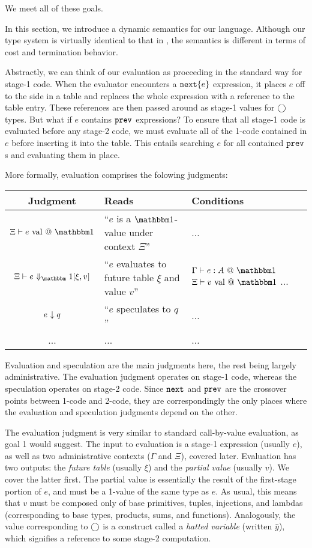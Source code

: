 \documentclass{sigplanconf}
\begin{document}
We meet all of these goals.

In this section, we introduce a dynamic semantics for our language.  Although our type system is virtually identical to that in \cite{davies96}, the semantics is different in terms of cost and termination behavior. 

Abstractly, we can think of our evaluation as proceeding in the standard way for stage-1 code. When the evaluator encounters a ${\tt next} \{e\}$ expression, it places $e$ off to the side in a table and replaces the whole expression with a reference to the table entry.  These references are then passed around as stage-1 values for $\bigcirc$ types.  But what if $e$ contains ${\tt prev}$ expressions?  To ensure that all stage-1 code is evaluated before any stage-2 code, we must evaluate all of the 1-code contained in $e$ before inserting it into the table.  This entails searching $e$ for all contained ${\tt prev}$s and evaluating them in place.  

More formally, evaluation comprises the folowing judgments:

\begin{center}
\begin{tabular}{|c|p{2.5cm}|p{2.5cm}|} \hline
Judgment & Reads & Conditions \\ \hline 
$\isvalone e$ & ``$e$ is a $\bbone$-value under context $\Xi$'' & ... \\ \hline 
$\Xi \vdash \diaonesub$ & ``$e$ evaluates to future table $\xi$ and value $v$'' 
& $\typesone e A$ 
	\newline $\isvalone v$ 
	\newline ... \\ \hline 
${e_{}} \downarrow {q_{}}$ & ``$e$ speculates to $q$'' & ... \\ \hline 
...&...&... \\ \hline
\end{tabular}
\end{center}

Evaluation and speculation are the main judgments here, the rest being largely administrative.  The evaluation judgment operates on stage-1 code, whereas the speculation operates on stage-2 code.  Since ${\tt next}$ and ${\tt prev}$ are the crossover points between 1-code and 2-code, they are correspondingly the only places where the evaluation and speculation judgments depend on the other. 


The evaluation judgment is very similar to standard call-by-value evaluation, as goal 1 would suggest.  The input to evaluation is a stage-1 expression (usually $e$), as well as two administrative contexts ($\Gamma$ and $\Xi$), covered later.  Evaluation has two outputs: the {\em future table} (usually $\xi$) and the {\em partial value} (usually $v$).  We cover the latter first.  The partial value is essentially the result of the first-stage portion of $e$, and must be a 1-value of the same type as $e$.  As usual, this means that $v$ must be composed only of base primitives, tuples, injections, and lambdas (corresponding to base types, products, sums, and functions).  Analogously, the value corresponding to $\bigcirc$ is a construct called a {\em hatted variable} (written $\hat y$), which signifies a reference to some stage-2 computation.  
\end{document}
